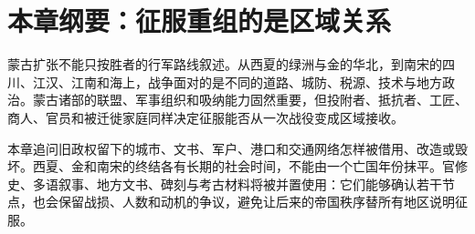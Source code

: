 \section{本章纲要：征服重组的是区域关系}

蒙古扩张不能只按胜者的行军路线叙述。从西夏的绿洲与金的华北，到南宋的四川、江汉、江南和海上，战争面对的是不同的道路、城防、税源、技术与地方政治。蒙古诸部的联盟、军事组织和吸纳能力固然重要，但投附者、抵抗者、工匠、商人、官员和被迁徙家庭同样决定征服能否从一次战役变成区域接收。

本章追问旧政权留下的城市、文书、军户、港口和交通网络怎样被借用、改造或毁坏。西夏、金和南宋的终结各有长期的社会时间，不能由一个亡国年份抹平。官修史、多语叙事、地方文书、碑刻与考古材料将被并置使用：它们能够确认若干节点，也会保留战损、人数和动机的争议，避免让后来的帝国秩序替所有地区说明征服。

